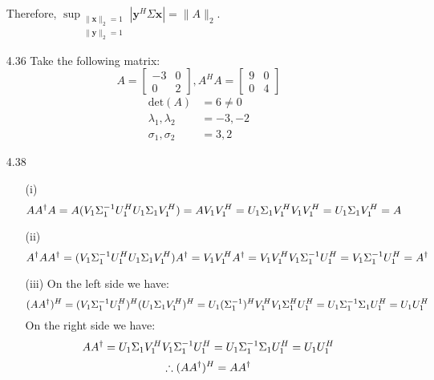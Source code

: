 \documentclass[letterpaper,12pt]{article}
\theoremstyle{definition}
\begin{document}
\begin{enumerate}
    Therefore, $\sup_{\substack{\|\mathbf{x}\|_2=1\\\|\mathbf{y}\|_2=1}}|\mathbf{y}^H\Sigma\mathbf{x}|=\|A\|_2$.
  \item[4.36]
    Take the following matrix:
    \[
      A =
      \begin{bmatrix}
        -3 & 0 \\
        0 & 2
      \end{bmatrix},
      A^HA =
      \begin{bmatrix}
        9 & 0 \\
        0 & 4
      \end{bmatrix}
    \]
    \begin{align*}
      \text{det}(A) &= 6 \neq 0 \\
      \lambda_1, \lambda_2 &= -3, -2 \\
      \sigma_1, \sigma_2 &= 3, 2
    \end{align*}
  \item[4.38]
    \begin{enumerate}
      \item[(i)]
      \begin{equation*}
        AA^\text{\textdagger} A = A(V_1\Sigma_1^{-1}U_1^HU_1\Sigma_1V_1^H) =  AV_1V_1^H = U_1\Sigma_1V_1^HV_1V_1^H = U_1\Sigma_1V_1^H = A
      \end{equation*}
      \item[(ii)]
        \begin{equation*}
          A^\text{\textdagger} AA^\text{\textdagger} = (V_1\Sigma_1^{-1}U_1^HU_1\Sigma_1V_1^H)A^\text{\textdagger} = V_1V_1^HA^\text{\textdagger}= V_1V_1^HV_1\Sigma_1^{-1}U_1^H = V_1\Sigma_1^{-1}U_1^H = A^\text{\textdagger}
        \end{equation*}
      \item[(iii)]
      On the left side we have:
        \begin{equation*}
          (AA^\text{\textdagger})^H = (V_1\Sigma_1^{-1}U_1^H)^H(U_1\Sigma_1V_1^H)^H = U_1(\Sigma_1^{-1})^HV_1^HV_1\Sigma_1^HU_1^H = U_1\Sigma_1^{-1}\Sigma_1U_1^H = U_1U_1^H
        \end{equation*}
      On the right side we have:
        \begin{equation*}
          AA^\text{\textdagger} = U_1\Sigma_1V_1^HV_1\Sigma_1^{-1}U_1^H = U_1\Sigma_1^{-1}\Sigma_1U_1^H = U_1U_1^H
        \end{equation*}
        \begin{equation*}
          \therefore (AA^\text{\textdagger})^H = AA^\text{\textdagger}

\end{equation*}
\end{enumerate}
\end{enumerate}
\end{document}
